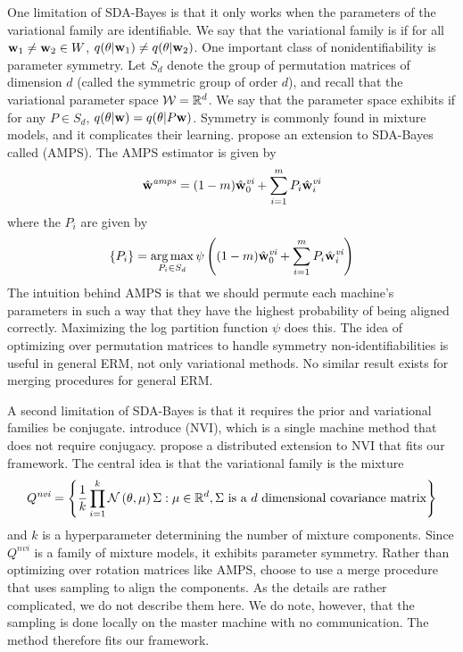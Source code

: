 \documentclass[thesis.tex]{subfiles}
\newcommand{\wvi}{\hat\w^\textit{vi}}
\newcommand{\wamps}{\hat\w^\textit{amps}}
\begin{document}
One limitation of SDA-Bayes is that it only works when the parameters of the variational family are identifiable.
We say that the variational family is  if for all $\mathbf w_1 \ne \mathbf w_2 \in W$, $q(\theta|\mathbf w_1)\ne q(\theta|\mathbf w_2)$.
One important class of nonidentifiability is parameter symmetry.
Let $S_d$ denote the group of permutation matrices of dimension $d$ 
(called the symmetric group of order $d$),
and recall that the variational parameter space ${\mathcal W}=\mathbb R^d$.
We say that the parameter space exhibits  if for any $P\in S_d$, $q(\theta|\mathbf w) = q(\theta|P\mathbf w)$.
Symmetry is commonly found in mixture models, 
and it complicates their learning.
\citet{campbell2014approximate} propose an extension to SDA-Bayes called  (AMPS).
The AMPS estimator is given by
\begin{equation}
\wamps = (1-m)\wvi_0+\sum_{i=1}^mP_i\wvi_i
\end{equation}
where the $P_i$ are given by
\begin{equation}
    \{P_i\} = \argmax_{P_i\in S_d} \psi\left((1-m)\wvi_0+\sum_{i=1}^mP_i\wvi_i\right)
\end{equation}
The intuition behind AMPS is that we should permute each machine's parameters in such a way that they have the highest probability of being aligned correctly.
Maximizing the log partition function $\psi$ does this.
The idea of optimizing over permutation matrices to handle symmetry non-identifiabilities is useful in general ERM, not only variational methods.
No similar result exists for merging procedures for general ERM.

A second limitation of SDA-Bayes is that it requires the prior and variational families be conjugate.
\citet{gershman2012nonparametric} introduce  (NVI), 
which is a single machine method that does not require conjugacy.
\citet{neiswanger2015embarrassingly} propose a distributed extension to NVI that fits our framework.
The central idea is that the variational family is the mixture 
\begin{equation}
    Q^\textit{nvi}= \left\{\frac{1}{k}\prod_{i=1}^k \mathcal{N}\left({{\theta}},{{\mu}}\right){\Sigma} : \mu\in\mathbb R^d, \Sigma\text{ is a $d$ dimensional covariance matrix}\right\}
\end{equation}
and $k$ is a hyperparameter determining the number of mixture components.
Since $Q^\textit{nvi}$ is a family of mixture models, 
it exhibits parameter symmetry.
Rather than optimizing over rotation matrices like AMPS,
\citet{neiswanger2015embarrassingly} choose to use a merge procedure that uses sampling to align the components.
As the details are rather complicated,
we do not describe them here.
We do note, however, that the sampling is done locally on the master machine with no communication.
The method therefore fits our framework.
\end{document}

